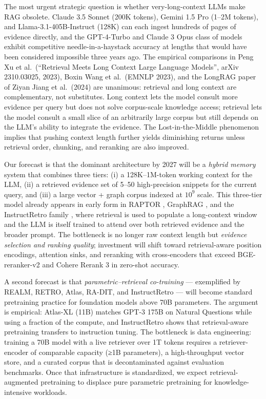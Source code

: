 \documentclass{article}
\begin{document}
The most urgent strategic question is whether very-long-context LLMs make RAG obsolete. Claude 3.5 Sonnet (200K tokens), Gemini 1.5 Pro (1--2M tokens), and Llama-3.1-405B-Instruct (128K) can each ingest hundreds of pages of evidence directly, and the GPT-4-Turbo and Claude 3 Opus class of models exhibit competitive needle-in-a-haystack accuracy at lengths that would have been considered impossible three years ago. The empirical comparisons in Peng Xu et al.~(``Retrieval Meets Long Context Large Language Models'', arXiv 2310.03025, 2023), Boxin Wang et al.~(EMNLP 2023), and the LongRAG paper of Ziyan Jiang et al.~(2024) are unanimous: retrieval and long context are complementary, not substitutes. Long context lets the model consult more evidence per query but does not solve corpus-scale knowledge access; retrieval lets the model consult a small slice of an arbitrarily large corpus but still depends on the LLM's ability to integrate the evidence. The Lost-in-the-Middle phenomenon \citep{liu2024lostinthemiddlehow} implies that pushing context length further yields diminishing returns unless retrieval order, chunking, and reranking are also improved.

Our forecast is that the dominant architecture by 2027 will be a \emph{hybrid memory} system that combines three tiers: (i) a 128K--1M-token working context for the LLM, (ii) a retrieved evidence set of 5--50 high-precision snippets for the current query, and (iii) a large vector + graph corpus indexed at \(10^9\) scale. This three-tier model already appears in early form in RAPTOR \citep{sarthi2024raptorrecursiveabs}, GraphRAG \citep{edge2024fromlocaltoglobala}, and the InstructRetro family \citep{wang20242024}, where retrieval is used to populate a long-context window and the LLM is itself trained to attend over both retrieved evidence and the broader prompt. The bottleneck is no longer raw context length but \emph{evidence selection and ranking quality}; investment will shift toward retrieval-aware position encodings, attention sinks, and reranking with cross-encoders that exceed BGE-reranker-v2 and Cohere Rerank 3 in zero-shot accuracy.

A second forecast is that \emph{parametric--retrieval co-training} --- exemplified by REALM, RETRO, Atlas, RA-DIT, and InstructRetro --- will become standard pretraining practice for foundation models above 70B parameters. The argument is empirical: Atlas-XL (11B) matches GPT-3 175B on Natural Questions while using a fraction of the compute, and InstructRetro \citep{wang20242024} shows that retrieval-aware pretraining transfers to instruction tuning. The bottleneck is data engineering: training a 70B model with a live retriever over 1T tokens requires a retriever-encoder of comparable capacity (≥1B parameters), a high-throughput vector store, and a curated corpus that is decontaminated against evaluation benchmarks. Once that infrastructure is standardized, we expect retrieval-augmented pretraining to displace pure parametric pretraining for knowledge-intensive workloads.
\end{document}
